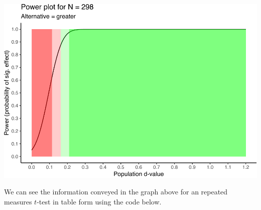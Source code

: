 \documentclass[
]{krantz}
\begin{document}
\includegraphics{bookdown_files/figure-latex/unnamed-chunk-354-1.pdf}

We can see the information conveyed in the graph above for an repeated measures \(t\)-test in table form using the code below.
\end{document}
